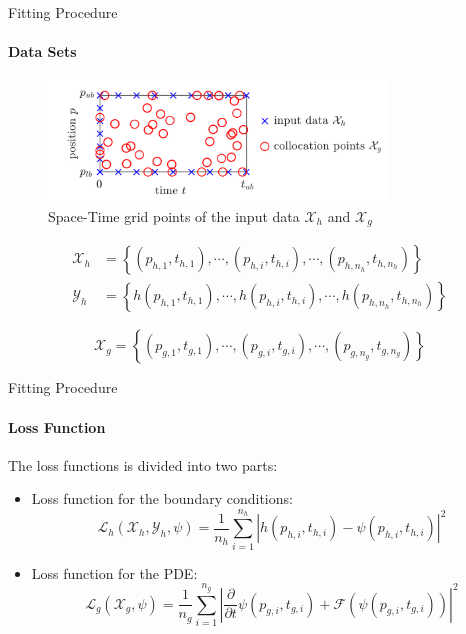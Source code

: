\begin{frame}{Fitting Procedure}
\framesubtitle{Data Sets}

\begin{figure}[H]
    \centering
    \includegraphics[width=0.8\textwidth]{img/space_time_grid.png}
    \caption{Space-Time grid points of the input data $\mathcal{X}_h$ and $\mathcal{X}_g$}
    \label{fig:space_time_grid}
\end{figure}   

\begin{align}
    \mathcal{X}_h &= \left\{
        \left(p_{h,1}, t_{h,1}\right),
        \cdots,
        \left(p_{h,i}, t_{h,i}\right),
        \cdots,
        \left(p_{h,n_h}, t_{h,n_h}\right)
    \right\}\\
    \mathcal{Y}_h &= \left\{
        h\left(p_{h,1}, t_{h,1}\right),
        \cdots,
        h\left(p_{h,i}, t_{h,i}\right),
        \cdots,
        h\left(p_{h,n_h}, t_{h,n_h}\right)
    \right\}
\end{align}

\begin{equation}
    \mathcal{X}_g = \left\{
        \left(p_{g,1}, t_{g,1}\right),
        \cdots,
        \left(p_{g,i}, t_{g,i}\right),
        \cdots,
        \left(p_{g,n_g}, t_{g,n_g}\right)
    \right\}
\end{equation}
\end{frame}

\begin{frame}{Fitting Procedure}
\framesubtitle{Loss Function}

The loss functions is divided into two parts:

\begin{itemize}
    \item Loss function for the boundary conditions:
    \begin{equation}
        \mathcal{L}_h (\mathcal{X}_h, \mathcal{Y}_h, \psi) = \frac{1}{n_h} \sum_{i=1}^{n_h} \left| h(p_{h,i}, t_{h,i}) - \psi(p_{h,i}, t_{h,i})  \right|^2
    \end{equation}
    \item Loss function for the PDE:
    \begin{equation}
        \mathcal{L}_g (\mathcal{X}_g, \psi)= \frac{1}{n_g} \sum_{i=1}^{n_g} \left| \frac{\partial }{\partial t}\psi(p_{g,i}, t_{g, i}) + \mathcal{F}(\psi(p_{g,i}, t_{g, i})) \right|^2
    \end{equation}
\end{itemize}
\end{frame}

